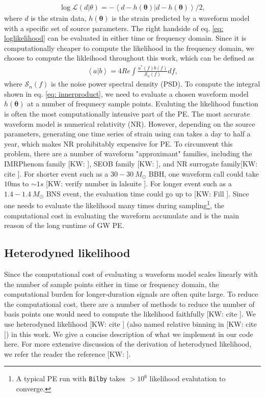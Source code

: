 \documentclass[twocolumn]{aastex631}
\newcommand{\kw}[1]{{\color{rb4}[KW: #1 ]}}
\begin{document}
\begin{align}
    \log{\mathcal{L}(d|\theta)} = -\left<d-h(\mathbf{\theta})|d-h(\mathbf{\theta})\right>/2,
\label{eq: loglikelihood}
\end{align}
where $d$ is the strain data, $h(\mathbf{\theta})$ is the strain predicted by a
waveform model with a specific set of source parameters. The right handside of
eq. \ref{eq: loglikelihood} can be evaluated in either time or frequency domain.
Since it is computationally cheaper to compute the likelihood in the frequency
domain, we choose to compute the likleihood throughout this work, which can be defined as 
\begin{align}
    \left<a|b\right> = 4 Re\int \frac{a^*(f)b(f)}{\mathcal{S}_n(f)} df,
\label{eq: innerproduct}
\end{align}
where $\mathcal{S}_n(f)$ is the noise power spectral density (PSD). To compute
the integral shown in eq. \ref{eq: innerproduct}, we need to evaluate a chosen
waveform model $h(\mathbf{\theta})$ at a number of frequnecy sample points.
Evaluting the likelihood function is often the most computationally intensive
part of the PE. The most accurate waveform model is numerical relativity (NR).
However, depending on the source parameters, generating one time series of
strain using can takes a day to half a year, which makes NR prohibitably
expensive for PE. To circumvent this problem, there are a number of waveform
"approximant" families, including the IMRPhenom family \kw{}, SEOB family \kw{},
and NR surrogate family\kw{cite}. For shorter event such as a $30-30\ M_{\odot}$
BBH, one waveform call could take $10\text{ms}$ to $\sim 1s$ \kw{verify number
in lalsuite}. For longer event such as a $1.4-1.4\ M_{\odot}$ BNS event, the
evaluation time could go up to \kw{Fill}. Since one needs to evaluate the
likelihood many times during sampling\footnote{A typical PE run with
\texttt{Bilby} takes $>10^6$ likelihood evalutation to converge.}, the
computational cost in evaluating the waveform accumulate and is the main reason
of the long runtime of GW PE.

\subsection{Heterodyned likelihood}

Since the computational cost of evaluating a waveform model scales linearly with
the number of sample points either in time or frequency domain, the
computational burden for longer-duration signals are often quite large. To
reduce the computational cost, there are a number of methods to reduce the
number of basis points one would need to compute the likelihood faithfully
\kw{cite}. We use heterodyned likelihood \kw{cite} (also named relative binning
in \kw{cite}) in this work. We give a concise description of what we implement
in our code here. For more extensive discussion of the derivation of heterodyned
likelihood, we refer the reader the reference \kw{}.
\end{document}
